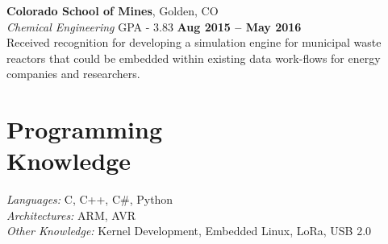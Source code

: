 \documentclass[margin,line]{resume}
\begin{document}
\begin{resume}
    \textbf{Colorado School of Mines}, Golden, CO \vspace{2mm}\\\vspace{1mm}%
    \textsl{Chemical Engineering} GPA - 3.83 \hfill \textbf{Aug 2015 -- May 2016}\\
    Received recognition for developing a simulation engine for municipal waste
    reactors that could be embedded within existing data work-flows for energy
    companies and researchers.

    \section{\mysidestyle Programming\\Knowledge}

    \emph{Languages:} C, C++, C\#, Python\\
    \emph{Architectures:} ARM, AVR\\
    \emph{Other Knowledge:} Kernel Development, Embedded Linux,
                            LoRa, USB 2.0\\
\end{resume}
\end{document}
